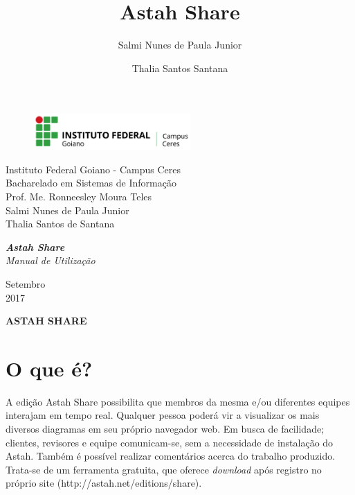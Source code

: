 \documentclass[12pt,a4paper]{article}
\title{Astah Share}
\author{Salmi Nunes de Paula Junior \and Thalia Santos Santana}
\begin{document}
\begin{titlepage}


\begin{center}
\begin{figure}[htb]
		
		\label{figura:LogoIF}
	
		\centering
		\includegraphics[width=6cm]{logo.png} 
\end{figure}


Instituto Federal Goiano - Campus Ceres\\
Bacharelado em Sistemas de Informação\\
Prof. Me. Ronneesley Moura Teles\\\vspace{0.2cm}
Salmi Nunes de Paula Junior \\
Thalia Santos de Santana\\\vspace{7.0cm}

\textit{\textbf{\Large{Astah Share}}}\\\vspace{0.5cm}
\textit{\Large{Manual de Utilização}}\\\vspace{9.5cm}

Setembro\\
2017\\
\end{center}
\end{titlepage}



\tableofcontents

\newpage
\begin{center}
\textbf{\Large{ASTAH SHARE}}\\\vspace{0.5cm}
\end{center}
\section{O que é?}%

A edição Astah Share possibilita que membros da mesma e/ou diferentes equipes interajam em tempo real. Qualquer pessoa poderá vir a visualizar os mais diversos diagramas em seu próprio navegador web. Em busca de facilidade; clientes, revisores e equipe comunicam-se, sem a necessidade de instalação do Astah. Também é possível realizar comentários acerca do trabalho produzido. Trata-se de um ferramenta gratuita, que oferece \textit{download} após registro no próprio site (http://astah.net/editions/share).
\end{document}
